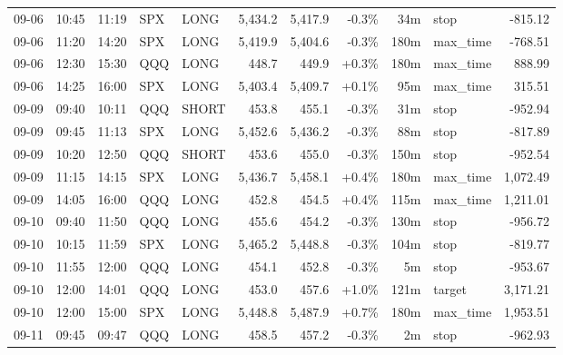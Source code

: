 \documentclass[11pt,a4paper,twoside]{article}
\begin{document}
\begin{center}
\begin{longtable}{>{\color{txtmain}}l l l l l r r r r >{\color{txtmain}}l r}
09-06 & 10:45 & 11:19 & SPX & LONG & 5,434.2 & 5,417.9 & \textcolor{lossred}{-0.3\%} & 34m & stop & \textcolor{lossred}{-815.12} \\
09-06 & 11:20 & 14:20 & SPX & LONG & 5,419.9 & 5,404.6 & \textcolor{lossred}{-0.3\%} & 180m & max\_time & \textcolor{lossred}{-768.51} \\
09-06 & 12:30 & 15:30 & QQQ & LONG & 448.7 & 449.9 & \textcolor{wingreen}{+0.3\%} & 180m & max\_time & \textcolor{wingreen}{888.99} \\
09-06 & 14:25 & 16:00 & SPX & LONG & 5,403.4 & 5,409.7 & \textcolor{wingreen}{+0.1\%} & 95m & max\_time & \textcolor{wingreen}{315.51} \\
09-09 & 09:40 & 10:11 & QQQ & SHORT & 453.8 & 455.1 & \textcolor{lossred}{-0.3\%} & 31m & stop & \textcolor{lossred}{-952.94} \\
09-09 & 09:45 & 11:13 & SPX & LONG & 5,452.6 & 5,436.2 & \textcolor{lossred}{-0.3\%} & 88m & stop & \textcolor{lossred}{-817.89} \\
09-09 & 10:20 & 12:50 & QQQ & SHORT & 453.6 & 455.0 & \textcolor{lossred}{-0.3\%} & 150m & stop & \textcolor{lossred}{-952.54} \\
09-09 & 11:15 & 14:15 & SPX & LONG & 5,436.7 & 5,458.1 & \textcolor{wingreen}{+0.4\%} & 180m & max\_time & \textcolor{wingreen}{1,072.49} \\
09-09 & 14:05 & 16:00 & QQQ & LONG & 452.8 & 454.5 & \textcolor{wingreen}{+0.4\%} & 115m & max\_time & \textcolor{wingreen}{1,211.01} \\
09-10 & 09:40 & 11:50 & QQQ & LONG & 455.6 & 454.2 & \textcolor{lossred}{-0.3\%} & 130m & stop & \textcolor{lossred}{-956.72} \\
09-10 & 10:15 & 11:59 & SPX & LONG & 5,465.2 & 5,448.8 & \textcolor{lossred}{-0.3\%} & 104m & stop & \textcolor{lossred}{-819.77} \\
09-10 & 11:55 & 12:00 & QQQ & LONG & 454.1 & 452.8 & \textcolor{lossred}{-0.3\%} & 5m & stop & \textcolor{lossred}{-953.67} \\
09-10 & 12:00 & 14:01 & QQQ & LONG & 453.0 & 457.6 & \textcolor{wingreen}{+1.0\%} & 121m & target & \textcolor{wingreen}{3,171.21} \\
09-10 & 12:00 & 15:00 & SPX & LONG & 5,448.8 & 5,487.9 & \textcolor{wingreen}{+0.7\%} & 180m & max\_time & \textcolor{wingreen}{1,953.51} \\
09-11 & 09:45 & 09:47 & QQQ & LONG & 458.5 & 457.2 & \textcolor{lossred}{-0.3\%} & 2m & stop & \textcolor{lossred}{-962.93} \\

\end{longtable}
\end{center}
\end{document}
